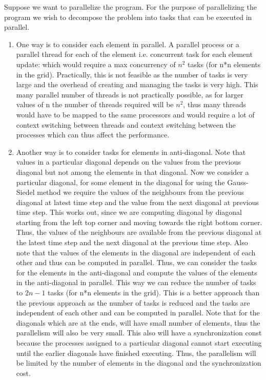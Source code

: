 \documentclass[12pt]{article}
\begin{document}
Suppose we want to parallelize the program. For the purpose of parallelizing the program we wish to decompose the problem into tasks that can be executed in parallel.
\begin{enumerate}
\item One way is to consider each element in parallel. A parallel process or a parallel thread for each of the element i.e. concurrent task for each element update:
which would require a max concurrency of $n^2$ tasks (for n*n elements in the grid). Practically, this is not feasible as the number of tasks is very large and the overhead of creating and managing the tasks is very high. This many parallel number of threads is not practically possible,
as for larger values of n the number of threads required will be $n^2$, thus many threads would have to be mapped to the same processors and would require a lot of context switching between threads and context switching between the processes which can thus affect the performance.
\item Another way is to consider tasks for elements in anti-diagonal. Note that values in a particular diagonal depends on the values from the previous diagonal but not among the elements in that diagonal.
Now we consider a particular diagonal, for some element in the diagonal for using the Gauss-Siedel method we require the values of the neighbours from the previous diagonal at latest time step and the value from the next diagonal at previous time step. This works out, since we are computing diagonal by diagonal 
starting from the left top corner and moving towards the right bottom corner. Thus, the values of the neighbours are available from the previous diagonal at the latest time step and the next diagonal at the previous time step. Also note that the values of the elements in the diagonal are independent of each other and thus can be computed in parallel.
Thus, we can consider the tasks for the elements in the anti-diagonal and compute the values of the elements in the anti-diagonal in parallel. This way we can reduce the number of tasks to $2n-1$ tasks (for n*n elements in the grid). This is a better approach than the previous approach as the number of tasks is reduced and the tasks are independent of each other and can be computed in parallel.
Note that for the diagonals which are at the ends, will have small number of elements, thus the parallelism will also be very small. This also will have a synchronization const because the processes assigned to a particular diagonal cannot start executing until the earlier diagonals
have finished executing. Thus, the parallelism will be limited by the number of elements in the diagonal and the synchronization cost.

\end{enumerate}
\end{document}
